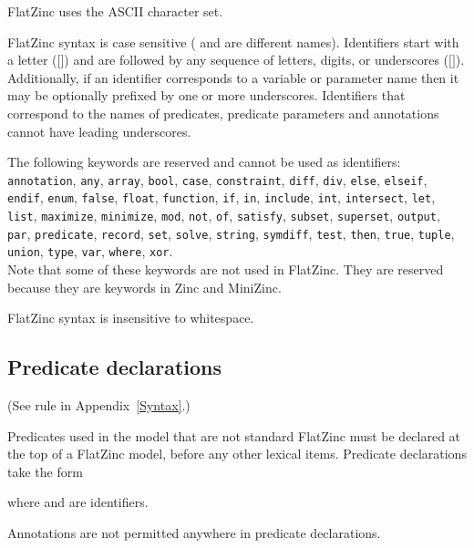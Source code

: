 \documentclass[a4paper]{article}
\begin{document}
FlatZinc uses the ASCII character set.

FlatZinc syntax is case sensitive ( and  are different
names).
Identifiers start with a letter (\([\)\(]\)) and are followed by
any sequence of letters, digits, or underscores (\([\)\(]\)).
Additionally, if an identifier corresponds to a variable or parameter name
then it may be optionally prefixed by one or more underscores.
Identifiers that correspond to the names of predicates, predicate parameters
and annotations cannot have leading underscores.

The following keywords are reserved and cannot be used as identifiers:
\texttt{annotation}, 
\texttt{any}, 
\texttt{array}, 
\texttt{bool}, 
\texttt{case},
\texttt{constraint}, 
\texttt{diff},
\texttt{div},
\texttt{else},
\texttt{elseif}, 
\texttt{endif}, 
\texttt{enum}, 
\texttt{false}, 
\texttt{float},
\texttt{function},
\texttt{if},
\texttt{in},
\texttt{include},
\texttt{int},
\texttt{intersect},
\texttt{let},
\texttt{list},
\texttt{maximize},
\texttt{minimize},
\texttt{mod},
\texttt{not},
\texttt{of},
\texttt{satisfy},
\texttt{subset},
\texttt{superset},
\texttt{output},
\texttt{par},
\texttt{predicate},
\texttt{record},
\texttt{set},
\texttt{solve},
\texttt{string},
\texttt{symdiff},
\texttt{test},
\texttt{then},
\texttt{true},
\texttt{tuple},
\texttt{union},
\texttt{type},
\texttt{var},
\texttt{where},
\texttt{xor}.\\
Note that some of these keywords are not used in FlatZinc.
They are reserved because they are keywords in Zinc and MiniZinc.

FlatZinc syntax is insensitive to whitespace.

\subsection{Predicate declarations}

(See rule  in Appendix~\ref{Syntax}.)

Predicates used in the model that are not standard FlatZinc must be
declared at the top of a FlatZinc model, before any other lexical items.
Predicate declarations take the form


where \fzpredname{} and \fzargname{} are identifiers.

Annotations are not permitted anywhere in predicate declarations.
\end{document}
